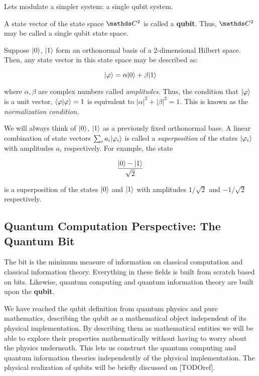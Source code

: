 Lets modulate a simpler system: a single qubit system.

\begin{definition}
	A state vector of the state space $\C^{2}$ is called a \textbf{qubit}. Thus, $\C^{2}$ may be called a single qubit state space.
\end{definition}

Suppose $|0\rangle$, $|1\rangle$ form an orthonormal basis of a 2-dimensional Hilbert space. Then, any state vector in this state space may be described as:

$$ |\varphi\rangle = \alpha|0\rangle + \beta|1\rangle $$

where $\alpha,\beta$ are complex numbers called \emph{amplitudes}. Thus, the condition that $|\varphi\rangle$ is a unit vector, $\langle\varphi|\varphi\rangle = 1$ is equivalent to $|\alpha|^2 + |\beta|^2 = 1$. This is known as the \emph{normalization condition}.

We will always think of $|0\rangle$, $|1\rangle$ as a previously fixed orthonormal base. A linear combination of state vectors $\sum_i a_i |\varphi_i\rangle$ is called a \emph{superposition} of the states $|\varphi_i\rangle$ with amplitudes $a_i$ respectively. For example, the state

$$ \frac{|0\rangle - |1\rangle}{\sqrt 2} $$

is a superposition of the states $|0\rangle$ and $|1\rangle$ with amplitudes $1/\sqrt 2$ and $-1/\sqrt 2$ respectively.


\subsection{Quantum Computation Perspective: The Quantum Bit}


The bit is the minimum measure of information on classical computation and classical information theory. Everything in these fields is built from scratch based on bits. Likewise, quantum computing and quantum information theory are built upon the \textbf{qubit}.

We have reached the qubit definition from quantum physics and pure mathematics, describing the qubit as a mathematical object independent of its physical implementation. By describing them as mathematical entities we will be able to explore their properties mathematically without having to worry about the physics underneath. This lets us construct the quantum computing and quantum information theories independently of the physical implementation. The physical realization of qubits will be briefly discussed on [TODOref].

